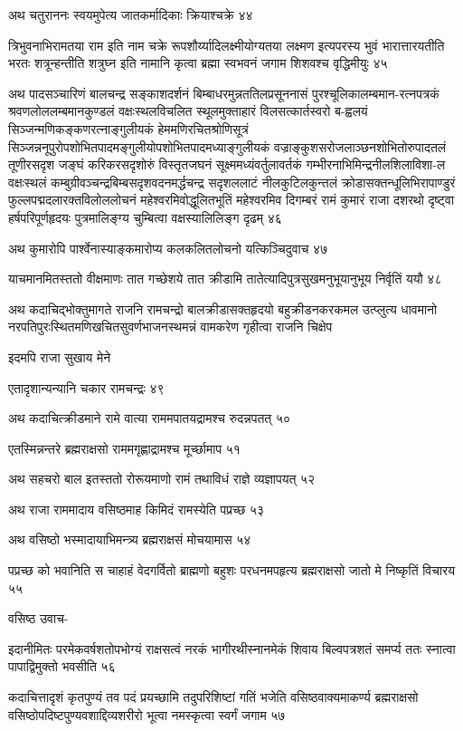 अथ चतुराननः स्वयमुपेत्य जातकर्मादिकाः क्रियाश्चक्रे ४४

त्रिभुवनाभिरामतया राम इति नाम चक्रे रूपशौर्य्यादिलक्ष्मीयोग्यतया लक्ष्मण इत्यपरस्य भुवं
भारात्तारयतीति भरतः शत्रून्हन्तीति शत्रुघ्न इति नामानि कृत्वा ब्रह्मा स्वभवनं जगाम
शिशवश्च वृद्धिमीयुः ४५

अथ पादसञ्चारिणं बालचन्द्र सङ्काशदर्शनं बिम्बाधरमुन्नततिलप्रसूननासं पुरश्चूलिकालम्बमान-रत्नपत्रकं
श्रवणलोललम्बमानकुण्डलं वक्षःस्थलविचलित स्थूलमुक्ताहारं विलसत्कार्तस्वरो ब-ह्वलयं
सिञ्जन्मणिकङ्कणरत्नाङ्गुलीयकं हेममणिरचितश्रोणिसूत्रं
सिञ्जन्ननूपुरोपशोभितपादमङ्गुलीयोपशोभितपादमध्याङ्गुलीयकं वज्राङ्कुशसरोजलाञ्छनशोभितोरुपादतलं
तूणीरसदृश जङ्घं करिकरसदृशोरुं विस्तृतजघनं सूक्ष्ममध्यंवर्तुलावर्तकं
गम्भीरनाभिमिन्द्रनीलशिलाविशा-ल वक्षःस्थलं कम्बुग्रीवञ्चन्द्रबिम्बसदृशवदनमर्द्धचन्द्र सदृशललाटं
नीलकुटिलकुन्तलं क्रोडासक्तन्धूलिभिरापाण्डुरं फुल्लपद्मदलारक्तविलोललोचनं महेश्वरमिवोद्धूलितभूतिं
महेश्वरमिव दिगम्बरं रामं कुमारं राजा दशरथो दृष्ट्वा हर्षपरिपूर्णहृदयः पुत्रमालिङ्ग्य चुम्बित्वा
वक्षस्यालिलिङ्ग दृढम् ४६

अथ कुमारोपि पार्श्वेनास्याङ्कमारोप्य कलकलितलोचनो यत्किञ्चिदुवाच ४७

याचमानमितस्ततो वीक्षमाणः तात गच्छेशये तात क्रीडामि तातेत्यादिपुत्रसुखमनुभूयानुभूय
निर्वृतिं ययौ ४८

अथ कदाचिद्भोक्तुमागते राजनि रामचन्द्रो बालक्रीडासक्तहृदयो बहुक्रीडनकरकमल उत्प्लुत्य
धावमानो नरपतिपुरःस्थितमणिखचितसुवर्णभाजनस्थमन्नं वामकरेण गृहीत्वा राजनि चिक्षेप

इदमपि राजा सुखाय मेने

एतादृशान्यन्यानि चकार रामचन्द्रः ४९

अथ कदाचित्क्रीडमाने रामे वात्या राममपातयद्रामश्च रुदन्नपतत् ५०

एतस्मिन्नन्तरे ब्रह्मराक्षसो राममगृह्णाद्रामश्च मूर्च्छामाप ५१

अथ सहचरो बाल इतस्ततो रोरूयमाणो रामं तथाविधं राज्ञे व्यज्ञापयत् ५२

अथ राजा राममादाय वसिष्ठमाह किमिदं रामस्येति पप्रच्छ ५३

अथ वसिष्ठो भस्मादायाभिमन्त्र्य ब्रह्मराक्षसं मोचयामास ५४

पप्रच्छ को भवानिति स चाहाहं वेदगर्वितो ब्राह्मणो बहुशः परधनमपहृत्य ब्रह्मराक्षसो जातो
मे निष्कृतिं विचारय ५५

वसिष्ठ उवाच-

इदानीमितः परमेकवर्षशतोपभोग्यं राक्षसत्वं नरकं भागीरथीस्नानमेकं शिवाय बिल्वपत्रशतं
समर्प्य ततः स्नात्वा पापाद्विमुक्तो भवसीति ५६

कदाचित्तादृशं कृतपुण्यं तव पदं प्रयच्छामि तदुपरिशिष्टां गतिं भजेति वसिष्ठवाक्यमाकर्ण्य
ब्रह्मराक्षसो वसिष्ठोपदिष्टपुण्यवशाद्दिव्यशरीरो भूत्वा नमस्कृत्वा स्वर्गं जगाम ५७

